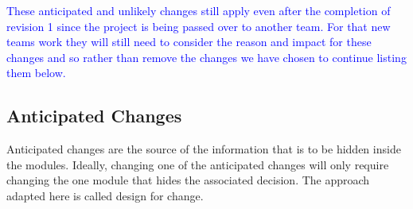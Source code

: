 \documentclass[12pt, titlepage]{article}
\begin{document}
\textcolor{blue}{These anticipated and unlikely changes still apply even after the completion of revision 1 since the project is being passed over to another team. For that new teams work they will still need to consider the reason and impact for these changes and so rather than remove the changes we have chosen to continue listing them below.}

\subsection{Anticipated Changes} \label{SecAchange}

Anticipated changes are the source of the information that is to be hidden
inside the modules. Ideally, changing one of the anticipated changes will only
require changing the one module that hides the associated decision. The approach
adapted here is called design for
change.
\end{document}
